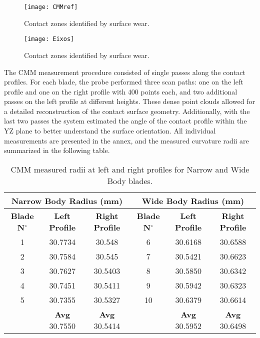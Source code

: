 \begin{figure}[H]
    \centering
    \texttt{[image: CMMref]}
    \caption{Contact zones identified by surface wear.}
    \label{fig:CMMref}
\end{figure}

\begin{figure}[H]
    \centering
    \texttt{[image: Eixos]}
    \caption{Contact zones identified by surface wear.}
    \label{fig:Eixos}
\end{figure}

The CMM measurement procedure consisted of single passes along the contact profiles. For each blade, the probe performed three scan paths: one on the left profile and one on the right profile with 400 points each, and two additional passes on the left profile at different heights. These dense point clouds allowed for a detailed reconstruction of the contact surface geometry.
Additionally, with the last two passes the system estimated the angle of the contact profile within the YZ plane to better understand the surface orientation. All individual measurements are presented in the annex, and the measured curvature radii are summarized in the following table.

\begin{table}[H]
    \centering
    \caption{CMM measured radii at left and right profiles for Narrow and Wide Body blades.}
    \begin{tabular}{ccc|ccc}
    \hline
    \multicolumn{3}{c}{\textbf{Narrow Body Radius (mm)}} & \multicolumn{3}{c}{\textbf{Wide Body Radius (mm)}} \\ \hline
    \textbf{Blade N$^{\circ}$} & \textbf{Left Profile} & \textbf{Right Profile} & \textbf{Blade N$^{\circ}$} & \textbf{Left Profile} & \textbf{Right Profile} \\ \hline
    1 & 30.7734 & 30.548  & 6 & 30.6168 & 30.6588 \\
    2 & 30.7584 & 30.545  & 7 & 30.5421 & 30.6623 \\
    3 & 30.7627 & 30.5403 & 8 & 30.5850 & 30.6342 \\ 
    4 & 30.7451 & 30.5411 & 9 & 30.5942 & 30.6323 \\ 
    5 & 30.7355 & 30.5327 & 10 & 30.6379 & 30.6614 \\ \hline
     & \textbf{Avg} 30.7550 & \textbf{Avg} 30.5414 & & \textbf{Avg} 30.5952 & \textbf{Avg} 30.6498 \\ \hline
    \end{tabular}
\end{table}
    
